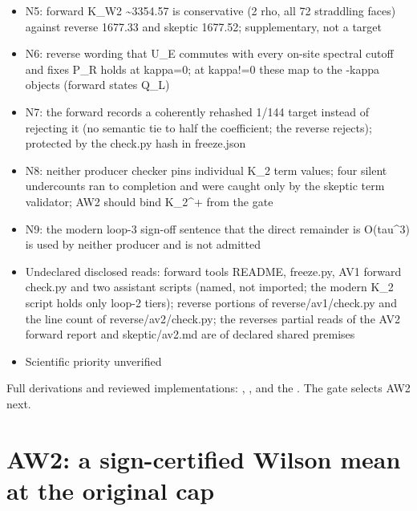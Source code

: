 \begin{gatequote}
\begin{itemize}
\textasciitilde{}103.5\textquotesingle{} is the ratio to 1/288; the contract
sign margin is 1/(144 K\_2\textasciicircum{}+ tau) \textasciitilde{}207.02
\item N5: forward K\_W2 \textasciitilde{}3354.57 is conservative (2 rho, all
72 straddling faces) against reverse 1677.33 and skeptic 1677.52;
supplementary, not a target
\item N6: reverse wording that U\_E commutes with every on-site spectral
cutoff and fixes P\_R holds at kappa=0; at kappa!=0 these map to the -kappa
objects (forward states Q\_L\textquotesingle{})
\item N7: the forward records a coherently rehashed 1/144 target instead of
rejecting it (no semantic tie to half the coefficient; the reverse rejects);
protected by the check.py hash in freeze.json
\item N8: neither producer checker pins individual K\_2 term values; four
silent undercounts ran to completion and were caught only by the skeptic term
validator; AW2 should bind K\_2\textasciicircum{}+ from the gate
\item N9: the modern loop-3 sign-off sentence that the direct remainder is
O(tau\textasciicircum{}3) is used by neither producer and is not admitted
\item Undeclared disclosed reads: forward tools README, freeze.py, AV1 forward
check.py and two assistant scripts (named, not imported; the modern K\_2
script holds only loop-2 tiers); reverse portions of reverse/av1/check.py and
the line count of reverse/av2/check.py; the reverse\textquotesingle{}s partial
reads of the AV2 forward report and skeptic/av2.md are of declared shared
premises
\item Scientific priority unverified
\end{itemize}
\end{gatequote}
Full derivations and reviewed implementations:
,
,
 and the
. The gate selects
AW2 next.

\section{AW2: a sign-certified Wilson mean at the original cap}
\label{sec:aw2}

